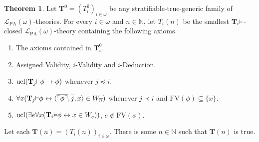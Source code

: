 \documentclass[reqno]{article}
\theoremstyle{definition}
\newtheorem{theorem}{Theorem}
\def\N{\mathbb{N}}
\def\L{\mathscr{L}}
\def\T{\mathbf{T}}
\def\FV{\mathrm{FV}}
\def\LPA{\L_{\mathrm{PA}}}
\renewcommand{\Pr}[1]{\T_{#1}\mbox{\small${\vDash}$}}
\newcommand{\ucl}[1]{\mathrm{ucl}(#1)}
\begin{document}
\begin{theorem}
\label{generalizedthreeonetwo}
Let $\T^0=(T^0_i)_{i\in\omega}$ be any stratifiable-true-generic family of $\LPA(\omega)$-theories.
For every $i\in\omega$ and $n\in\N$, let $T_i(n)$ be the smallest $\Pr i$-closed $\LPA(\omega)$-theory containing the following axioms.
\begin{enumerate}
\item The axioms contained in $\T^0_i$.
\item Assigned Validity, $i$-Validity and $i$-Deduction.
\item $\ucl{\Pr j\phi\rightarrow\phi}$ whenever $j\preceq i$.
\item $\forall x(\Pr j\phi\leftrightarrow\langle\overline{\ulcorner\phi\urcorner},\overline j,x\rangle\in W_{\overline n})$
whenever $j\prec i$ and $\FV(\phi)\subseteq\{x\}$.
\item $\ucl{\exists e\forall x(\Pr i\phi\leftrightarrow x\in W_e)}$, $e\not\in\FV(\phi)$.
\end{enumerate}
Let each $\T(n)=(T_i(n))_{i\in\omega}$.
There is some $n\in\N$ such that $\T(n)$ is true.
\end{theorem}
\end{document}
